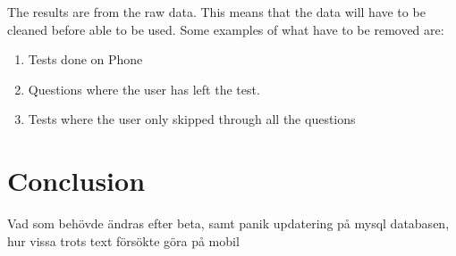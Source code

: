 The results are from the raw data. This means that the data will have to be cleaned before able to be used. Some examples of what have to be removed are: 

\begin{enumerate}
	\item Tests done on Phone
	\item Questions where the user has left the test.
	\item Tests where the user only skipped through all the questions
\end{enumerate}




\section{Conclusion}
Vad som behövde ändras efter beta, samt panik updatering på mysql databasen, hur vissa trots text försökte göra på mobil

